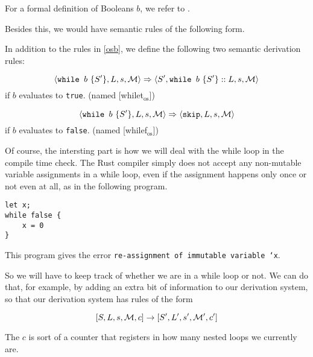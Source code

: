 For a formal definition of Booleans $b$, we refer to \cite{nielson1992semantics}.

Besides this, we would have semantic rules of the following form. 

\begin{definition}
\label{oswhile}
In addition to the rules in \ref{osb}, we define the following two semantic derivation rules:

$$\langle \texttt{while } b~ \{ S' \}, L, s, \mathcal{M} \rangle \Rightarrow \langle S', \texttt{while } b~ \{ S' \}::L, s, \mathcal{M} \rangle$$ 
if $b$ evaluates to \texttt{true}. (named [whilet$_{\textrm{os}}$])

$$\langle \texttt{while } b~ \{ S' \}, L, s, \mathcal{M} \rangle \Rightarrow \langle \texttt{skip}, L, s, \mathcal{M} \rangle$$ 
if $b$ evaluates to \texttt{false}. (named [whilef$_{\textrm{os}}$])
\end{definition}

Of course, the intersting part is how we will deal with the while loop in the compile time check. The Rust compiler simply does not accept any non-mutable variable assignments in a while loop, even if the assignment happens only once or not even at all, as in the following program.

\begin{verbatim}
let x;
while false {
    x = 0
}
\end{verbatim}

This program gives the error \texttt{re-assignment of immutable variable `x}.

So we will have to keep track of whether we are in a while loop or not. We can do that, for example, by adding an extra bit of information to our derivation system, so that our derivation system has rules of the form 

$$[ S, L, s, \mathcal{M}, c ] \to [ S', L', s', \mathcal{M'}, c' ]$$

The $c$ is sort of a counter that registers in how many nested loops we currently are. 


